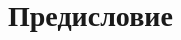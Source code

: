 \maketitle

\thispagestyle{mainpage}
\clearpage
\tableofcontents
\clearpage
\section*{Предисловие}

